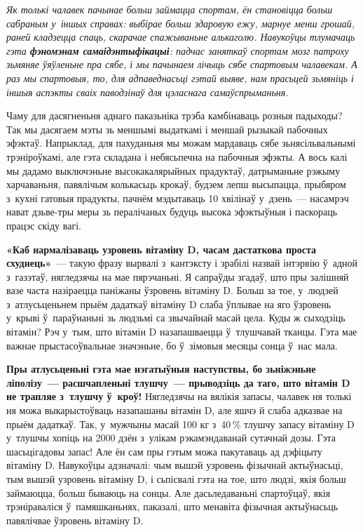 \emph{Як толькі чалавек пачынае больш займацца спортам, ён становіцца больш сабраным у~іншых справах: выбірае больш здаровую ежу, марнуе менш грошай, раней кладзецца спаць, скарачае спажываньне алькаголю. Навукоўцы тлумачаць гэта \textbf{фэномэнам самаідэнтыфікацыі}: падчас заняткаў спортам мозг патроху зьмяняе ўяўленьне пра сябе, і мы пачынаем лічыць сябе спартовым чалавекам. А раз мы спартовыя, то, для адпаведнасьці гэтай выяве, нам прасьцей зьмяніць і іншыя аспэкты сваіх паводзінаў для цэласнага самаўспрыманьня.}

Чаму для дасягненьня аднаго паказьніка трэба камбінаваць розныя падыходы? Так мы дасягаем мэты зь меншымі выдаткамі і меншай рызыкай пабочных эфэктаў. Напрыклад, для пахуданьня мы можам мардаваць сябе зьнясільвальнымі трэніроўкамі, але гэта складана і небясьпечна на пабочныя эфэкты. А вось калі мы дадамо выключэньне высокакалярыйных прадуктаў, датрыманьне рэжыму харчаваньня, павялічым колькасьць крокаў, будзем лепш высыпацца, прыбяром з~кухні гатовыя прадукты, пачнём мэдытаваць 10 хвілінаў у~дзень~--- насамрэч нават дзьве-тры меры зь пералічаных будуць высока эфэктыўныя і паскораць працэс скіду вагі.

\textbf{«Каб нармалізаваць узровень вітаміну D, часам дастаткова проста схуднець»}~--- такую фразу вырвалі з~кантэксту і зрабілі назвай інтэрвію ў~адной з~газэтаў, нягледзячы на мае пярэчаньні. Я сапраўды згадаў, што пры залішняй вазе часта назіраецца паніжаны ўзровень вітаміну D. Больш за тое, у~людзей з~атлусьценьнем прыём дадаткаў вітаміну D слаба ўплывае на яго ўзровень у~крыві ў~параўнаньні зь людзьмі са звычайнай масай цела. Куды ж сыходзіць вітамін? Рэч у~тым, што вітамін D назапашваецца ў~тлушчавай тканцы. Гэта мае важнае прыстасоўвальнае значэньне, бо ў~зімовыя месяцы сонца ў~нас мала.

\textbf{Пры атлусьценьні гэта мае нэгатыўныя наступствы, бо зьніжэньне ліполізу~--- расшчапленьні тлушчу~--- прыводзіць да таго, што вітамін D не трапляе з~тлушчу ў~кроў!} Нягледзячы на вялікія запасы, чалавек ня толькі ня можа выкарыстоўваць назапашаны вітамін D, але яшчэ й слаба адказвае на прыём дадаткаў. Так, у~мужчыны масай 100 кг з~40\,\% тлушчу запасу вітаміну D у~тлушчы хопіць на 2000 дзён з~улікам рэкамэндаванай сутачнай дозы. Гэта шасьцігадовы запас! Але ён сам пры гэтым можа пакутаваць ад дэфіцыту вітаміну D. Навукоўцы адзначалі: чым вышэй узровень фізычнай актыўнасьці, тым вышэй узровень вітаміну D, і сьпісвалі гэта на тое, што людзі, якія больш займаюцца, больш бываюць на сонцы. Але дасьледаваньні спартоўцаў, якія трэніраваліся ў~памяшканьнях, паказалі, што менавіта фізычная актыўнасьць павялічвае ўзровень вітаміну D.

